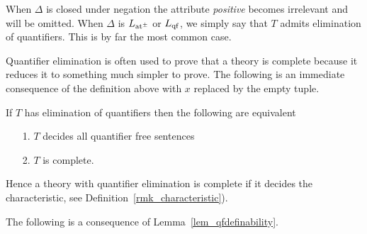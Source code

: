 
When $\Delta$ is closed under negation the attribute \textit{positive\/} becomes irrelevant and will be omitted. When $\Delta$ is $L_{\rm at^{\scriptscriptstyle\pm}}$ or $L_{\rm qf}$, we simply say that $T$ admits elimination of quantifiers. This is by far the most common case.

Quantifier elimination is often used to prove that a theory is complete because it reduces it to something much simpler to prove. The following is an immediate consequence of the definition above with $x$ replaced by the empty tuple.

\begin{remark}
If $T$ has elimination of quantifiers then the following are equivalent 
\begin{itemize}
\item[1.] $T$ decides all quantifier free sentences
\item[2.] $T$ is complete.
\end{itemize}
Hence a theory with quantifier elimination is complete if it decides the characteristic, see Definition~\ref{rmk_characteristic}).\QED
\end{remark}


The following is a consequence of Lemma~\ref{lem_qfdefinability}.

